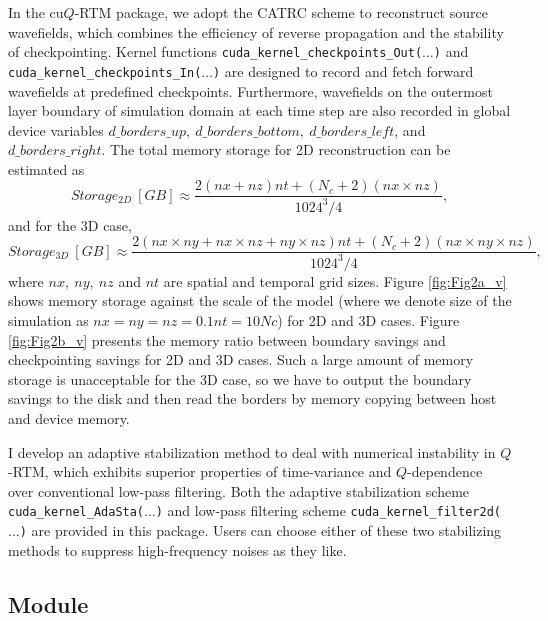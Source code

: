 In the cu$Q$-RTM package, we adopt the CATRC scheme to reconstruct source wavefields, which combines the efficiency of reverse propagation and the stability of checkpointing. Kernel functions \texttt{cuda\_kernel\_checkpoints\_Out($\ldots$)} and \texttt{cuda\_kernel\_checkpoints\_In($\ldots$)} are designed to record and fetch forward wavefields at predefined checkpoints. Furthermore,  wavefields on the outermost layer boundary of simulation domain at each time step are also recorded in global device variables $d\_borders\_up,\ d\_borders\_bottom,\ d\_borders\_left$, and $d\_borders\_right$.  The total memory storage for 2D reconstruction can be estimated as
\begin{equation}
\label{eq:Mem2d}
Storage_{2D}\ [GB] \approx \frac{2(nx+nz) nt + (N_c+2) (nx \times nz)}{1024^3/4},
\end{equation}
and for the 3D case, 
\begin{equation}
\label{eq:Mem3d}
Storage_{3D}\ [GB] \approx \frac{2(nx \times ny + nx \times nz + ny \times nz) nt + (N_c+2) (nx \times ny \times nz)}{1024^3/4},
\end{equation}
where $nx,\ ny,\ nz$ and $nt$ are spatial and temporal grid sizes. Figure \ref{fig:Fig2a_v} shows memory storage against the scale of the model (where we denote size of the simulation as $nx = ny = nz = 0.1 nt = 10 Nc$) for 2D and 3D cases. Figure \ref{fig:Fig2b_v} presents the memory ratio between boundary savings and checkpointing savings for 2D and 3D cases. Such a large amount of memory storage is  unacceptable for the 3D case, so we have to output the boundary savings to the disk and then read the borders by memory copying between host and device memory. 




I develop an adaptive stabilization method to deal with numerical instability in $Q$-RTM, which exhibits superior properties of time-variance and $Q$-dependence over conventional low-pass filtering. Both the adaptive stabilization scheme \texttt{cuda\_kernel\_AdaSta($\ldots$)} and low-pass filtering scheme \texttt{cuda\_kernel\_filter2d($\ldots$)} are provided in this package. Users can choose either of these two stabilizing methods to suppress high-frequency noises as they like.

\subsection{Module}

